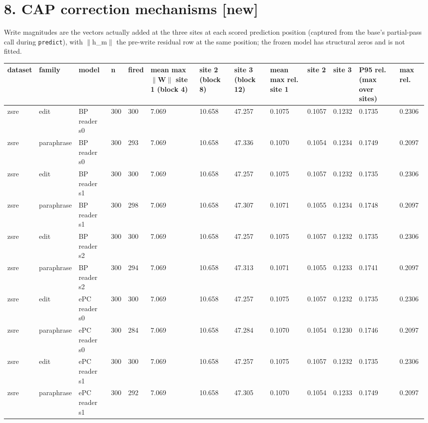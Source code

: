 \documentclass[10pt,a4paper]{article}
\begin{document}
\section*{8. CAP correction mechanisms [new]}



Write magnitudes are the vectors actually added at the three sites at each scored prediction position (captured from the base's partial-pass call during \texttt{predict}), with $\|$h\_m$\|$ the pre-write residual row at the same position; the frozen model has structural zeros and is not fitted.



\begin{center}\tiny
\begin{tabularx}{\textwidth}{@{}p{}XXXXXXXXXXXX@{}}
\toprule
dataset & family & model & n & fired & mean max $\|$W$\|$ site 1 (block 4) & site 2 (block 8) & site 3 (block 12) & mean max rel. site 1 & site 2 & site 3 & P95 rel. (max over sites) & max rel. \\ \midrule
zsre & edit & BP reader s0 & 300 & 300 & 7.069 & 10.658 & 47.257 & 0.1075 & 0.1057 & 0.1232 & 0.1735 & 0.2306 \\
zsre & paraphrase & BP reader s0 & 300 & 293 & 7.069 & 10.658 & 47.336 & 0.1070 & 0.1054 & 0.1234 & 0.1749 & 0.2097 \\
zsre & edit & BP reader s1 & 300 & 300 & 7.069 & 10.658 & 47.257 & 0.1075 & 0.1057 & 0.1232 & 0.1735 & 0.2306 \\
zsre & paraphrase & BP reader s1 & 300 & 298 & 7.069 & 10.658 & 47.307 & 0.1071 & 0.1055 & 0.1234 & 0.1748 & 0.2097 \\
zsre & edit & BP reader s2 & 300 & 300 & 7.069 & 10.658 & 47.257 & 0.1075 & 0.1057 & 0.1232 & 0.1735 & 0.2306 \\
zsre & paraphrase & BP reader s2 & 300 & 294 & 7.069 & 10.658 & 47.313 & 0.1071 & 0.1055 & 0.1233 & 0.1741 & 0.2097 \\
zsre & edit & ePC reader s0 & 300 & 300 & 7.069 & 10.658 & 47.257 & 0.1075 & 0.1057 & 0.1232 & 0.1735 & 0.2306 \\
zsre & paraphrase & ePC reader s0 & 300 & 284 & 7.069 & 10.658 & 47.284 & 0.1070 & 0.1054 & 0.1230 & 0.1746 & 0.2097 \\
zsre & edit & ePC reader s1 & 300 & 300 & 7.069 & 10.658 & 47.257 & 0.1075 & 0.1057 & 0.1232 & 0.1735 & 0.2306 \\
zsre & paraphrase & ePC reader s1 & 300 & 292 & 7.069 & 10.658 & 47.305 & 0.1070 & 0.1054 & 0.1233 & 0.1749 & 0.2097 \\

\end{tabularx}
\end{center}
\end{document}
